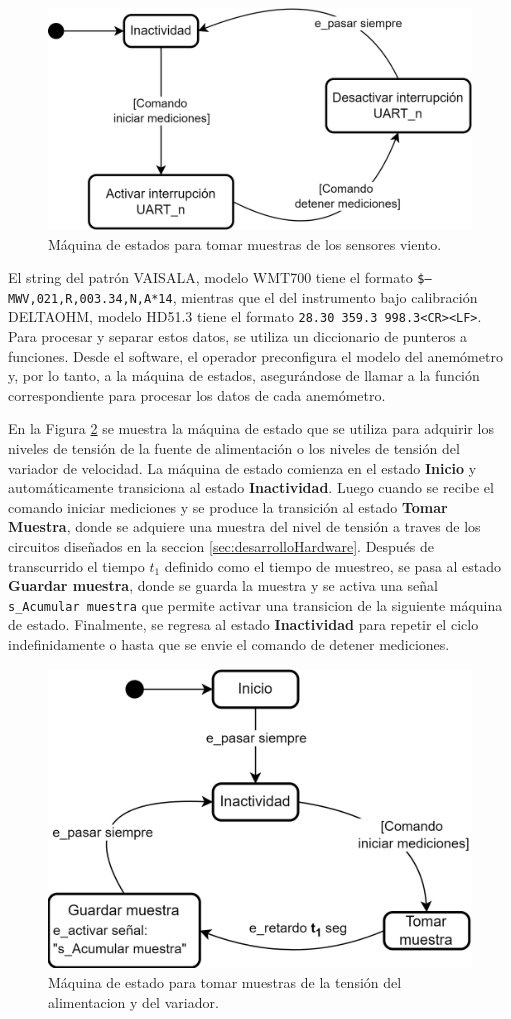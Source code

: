 \begin{figure}[H]
    \centering
    \includegraphics[width=0.6\linewidth]{Figuras/datalogger/Firmware/sc_sampleSensorWind.png}
    \caption{Máquina de estados para tomar muestras de los sensores viento.}
    \label{fig:sc_sampleSensorWind}
\end{figure}

El string del patrón VAISALA, modelo WMT700 tiene el formato \texttt{\$--MWV,021,R,003.34,N,A*14}, mientras que el del instrumento bajo calibración DELTAOHM, modelo HD51.3 tiene el formato \texttt{28.30 359.3 998.3<CR><LF>}. Para procesar y separar estos datos, se utiliza un diccionario de punteros a funciones. Desde el software, el operador preconfigura el modelo del anemómetro y, por lo tanto, a la máquina de estados, asegurándose de llamar a la función correspondiente para procesar los datos de cada anemómetro.

En la Figura \ref{fig:sc_sampleSensorVoltage} se muestra la máquina de estado que se utiliza para adquirir los niveles de tensión de la fuente de alimentación o los niveles de tensión del variador de velocidad. La máquina de estado comienza en el estado \textbf{Inicio} y automáticamente transiciona al estado \textbf{Inactividad}. Luego cuando se recibe el comando iniciar mediciones y se produce la transición al estado \textbf{Tomar Muestra}, donde se adquiere una muestra del nivel de tensión a traves de los circuitos diseñados en la seccion \ref{sec:desarrolloHardware}. Después de transcurrido el tiempo $t_{1}$ definido como el tiempo de muestreo, se pasa al estado \textbf{Guardar muestra}, donde se guarda la muestra  y se activa una señal \texttt{s\_Acumular muestra} que permite activar una transicion de la siguiente máquina de estado. Finalmente, se regresa al estado \textbf{Inactividad} para repetir el ciclo indefinidamente o hasta que se envie el comando de detener mediciones.

\begin{figure}[H]
    \centering
    \includegraphics[width=0.6\linewidth]{Figuras/datalogger/Firmware/sc_sampleSensorVoltage.png}
    \caption{Máquina de estado para tomar muestras de la tensión del alimentacion y del variador.}
    \label{fig:sc_sampleSensorVoltage}
\end{figure}

